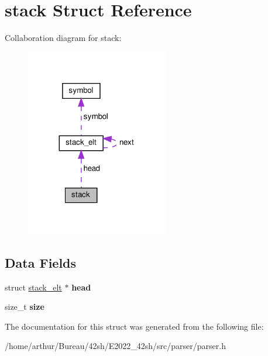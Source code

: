 \hypertarget{structstack}{}\section{stack Struct Reference}
\label{structstack}


Collaboration diagram for stack\+:
\nopagebreak
\begin{figure}[H]
\begin{center}
\leavevmode
\includegraphics[width=176pt]{structstack__coll__graph}
\end{center}
\end{figure}
\subsection*{Data Fields}
\begin{DoxyCompactItemize}
\item 
\mbox{\label{structstack_a9f6e3fc2386020c50296633644c596c0}} 
struct \hyperlink{structstack__elt}{stack\+\_\+elt} $\ast$ {\bfseries head}
\item 
\mbox{\label{structstack_a854352f53b148adc24983a58a1866d66}} 
size\+\_\+t {\bfseries size}
\end{DoxyCompactItemize}


The documentation for this struct was generated from the following file\+:\begin{DoxyCompactItemize}
\item 
/home/arthur/\+Bureau/42sh/\+E2022\+\_\+42sh/src/parser/parser.\+h\end{DoxyCompactItemize}
